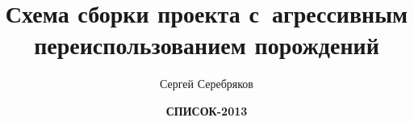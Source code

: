 \title{Схема сборки проекта с~агрессивным переиспользованием порождений}
	   
\author[Сергей Серебряков]{Сергей Серебряков}


\date{
	\textbf{СПИСОК-2013}
}